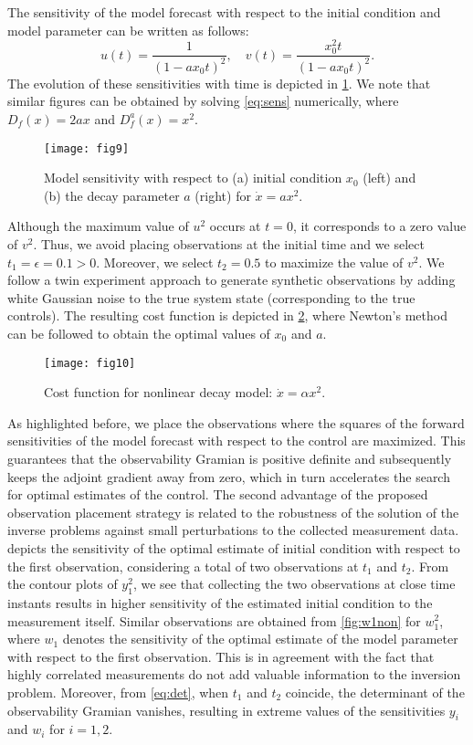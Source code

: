 \documentclass{article}
\begin{document}
The sensitivity of the model forecast with respect to the initial condition and model parameter can be written as follows:
\begin{equation}
    u(t) = \dfrac{1}{(1-a x_0 t)^2}, \quad v(t) = \dfrac{x_0^2t}{(1-a x_0t)^2}.
\end{equation}
The evolution of these sensitivities with time is depicted in \cref{fig:sensitivitynon}. We note that similar figures can be obtained by solving \cref{eq:sens} numerically, where $D_f(x) = 2a x$ and $D_f^{a}(x) = x^2$.
\begin{figure}[ht!]
    \centering
    \texttt{[image: fig9]}
    \caption{Model sensitivity with respect to (a) initial condition $x_0$ (left) and (b) the decay parameter $a$ (right) for $\dot{x} = a x^2$.}
    \label{fig:sensitivitynon}
\end{figure}

Although the maximum value of $u^2$ occurs at $t=0$, it corresponds to a zero value of $v^2$. Thus, we avoid placing observations at the initial time and we select $t_1=\epsilon=0.1>0$. Moreover, we select $t_2=0.5$ to maximize the value of $v^2$. We follow a twin experiment approach to generate synthetic observations by adding white Gaussian noise to the true system state (corresponding to the true controls). The resulting cost function is depicted in \cref{fig:costnon}, where Newton's method can be followed to obtain the optimal values of $x_0$ and $a$.
\begin{figure}[ht!]
    \centering
    \texttt{[image: fig10]}
    \caption{Cost function for nonlinear decay model: $\dot{x} = \alpha x^2$.}
    \label{fig:costnon}
\end{figure}

As highlighted before, we place the observations where the squares of the forward sensitivities of the model forecast with respect to the control are maximized. This guarantees that the observability Gramian is positive definite and subsequently keeps the adjoint gradient away from zero, which in turn accelerates the search for optimal estimates of the control. The second advantage of the proposed observation placement strategy is related to the robustness of the solution of the inverse problems against small perturbations to the collected measurement data.  depicts the sensitivity of the optimal estimate of initial condition with respect to the first observation, considering a total of two observations at $t_1$ and $t_2$. From the contour plots of $y_1^2$, we see that collecting the two observations at close time instants results in higher sensitivity of the estimated initial condition to the measurement itself. Similar observations are obtained from \cref{fig:w1non} for $w_1^2$, where $w_1$ denotes the sensitivity of the optimal estimate of the model parameter with respect to the first observation. This is in agreement with the fact that highly correlated measurements do not add valuable information to the inversion problem. Moreover, from \cref{eq:det}, when $t_1$ and $t_2$ coincide, the determinant of the observability Gramian vanishes, resulting in extreme values of the sensitivities $y_i$ and $w_i$ for $i=1,2$.
\end{document}
